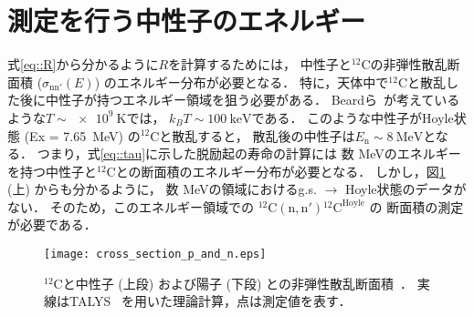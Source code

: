 \documentclass[../master]{subfiles}
\begin{document}
\section{測定を行う中性子のエネルギー}
式\eqref{eq::R}から分かるように$R$を計算するためには，
中性子と${}^{12}\mathrm{C}$の非弾性散乱断面積 ($\sigma_\mathrm{nn'} (E)$) のエネルギー分布が必要となる．
特に，天体中で${}^{12}\mathrm{C}$と散乱した後に中性子が持つエネルギー領域を狙う必要がある．
Beardら~\cite{hotdensemedium}が考えているような$T\sim\SI{e9}{\kelvin}$では，
$k_{B}T\sim\SI{100}{\kilo\electronvolt}$である．%
このような中性子がHoyle状態 (Ex = \SI{7.65}{\mega\electronvolt}) の${}^{12}\mathrm{C}$と散乱すると，
散乱後の中性子は$E_{\text{n}}\sim\SI{8}{\mega\electronvolt}$となる．
つまり，式\eqref{eq::tau}に示した脱励起の寿命の計算には
数 \si{\mega\electronvolt}のエネルギーを持つ中性子と${}^{12}\mathrm{C}$との断面積のエネルギー分布が必要となる．
しかし，図\ref{fig::crosssection_pres} (上) からも分かるように，
数 \si{\mega\electronvolt}の領域におけるg.s. $\rightarrow$ Hoyle状態のデータがない．
そのため，このエネルギー領域での ${}^{12}\mathrm{C}(\mathrm{n},\mathrm{n}'){}^{12}\mathrm{C}^{{\text{Hoyle}}}$ の
断面積の測定が必要である．
\begin{figure}
  \centering
  \texttt{[image: cross\_section\_p\_and\_n.eps]}
  \caption[${}^{12}\mathrm{C}$と中性子 (上段) および陽子 (下段) との非弾性散乱断面積．]
          {${}^{12}\mathrm{C}$と中性子 (上段) および陽子 (下段) との非弾性散乱断面積~\cite{hotdensemedium}．
  実線はTALYS~\cite{talys-1.0} を用いた理論計算，点は測定値を表す．}
  \label{fig::crosssection_pres}
\end{figure}
\end{document}
